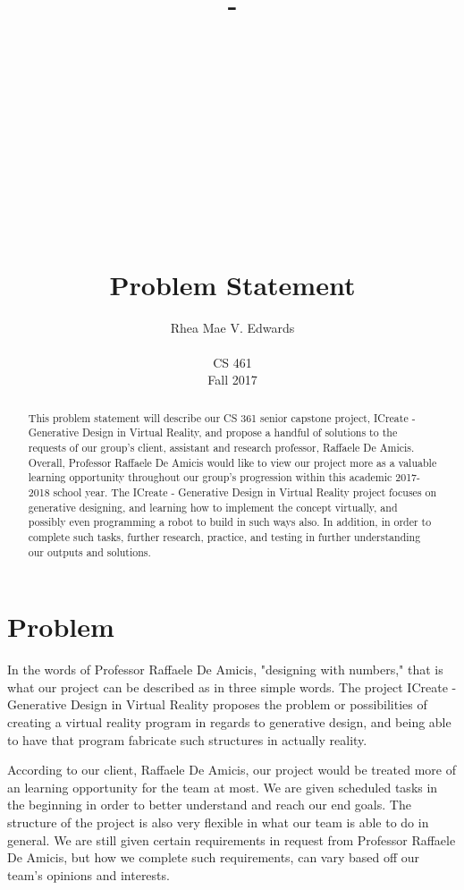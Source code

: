 \documentclass[letterpaper,10pt,onecolumn]{IEEEtran}
\title{-\\ ~ \\ ~ \\ ~ \\ ~ \\ ~ \\ ~ \\ ~ \\ Problem Statement}
\author{Rhea Mae V. Edwards\\ ~ \\CS 461\\Fall 2017}
\begin{document}
\maketitle

\begin{abstract}


\noindent
This problem statement will describe our CS 361 senior capstone project, ICreate - Generative Design in Virtual Reality, and propose a handful of solutions to the requests of our group's client, assistant and research professor, Raffaele De Amicis. Overall, Professor Raffaele De Amicis would like to view our project more as a valuable learning opportunity throughout our group's progression within this academic 2017-2018 school year. The ICreate - Generative Design in Virtual Reality project focuses on generative designing, and learning how to implement the concept virtually, and possibly even programming a robot to build in such ways also. In addition, in order to complete such tasks, further research, practice, and testing in further understanding our outputs and solutions.

\end{abstract}

\newpage

\section{\textbf{Problem}}

\iffalse
\noindent
Definition and description of the problem trying to solve
\par \noindent
Be sure to write this problem definition for a general but educated audience
\fi

\noindent
In the words of Professor Raffaele De Amicis, "designing with numbers," that is what our project can be described as in three simple words. The project ICreate - Generative Design in Virtual Reality proposes the problem or possibilities of creating a virtual reality program in regards to generative design, and being able to have that program fabricate such structures in actually reality. 

\noindent
According to our client, Raffaele De Amicis, our project would be treated more of an learning opportunity for the team at most. We are given scheduled tasks in the beginning in order to better understand and reach our end goals. The structure of the project is also very flexible in what our team is able to do in general. We are still given certain requirements in request from Professor Raffaele De Amicis, but how we complete such requirements, can vary based off our team's opinions and interests.
\end{document}
